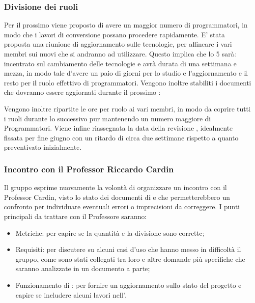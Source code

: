 \subsubsection{Divisione dei ruoli}
\par Per il prossimo  viene proposto di avere un maggior numero di programmatori, in modo che i lavori di conversione possano procedere rapidamente.
E' stata proposta una riunione di aggiornamento sulle tecnologie, per allineare i vari membri sui nuovi  che si andranno ad utilizzare.
Questo implica che lo  5 sarà: incentrato sul cambiamento delle tecnologie e avrà durata di una settimana e mezza, in modo tale d'avere un paio di giorni per lo studio e l'aggiornamento e il resto per il ruolo effettivo di programmatori.
Vengono inoltre stabiliti i documenti che dovranno essere aggiornati durante il prossimo :
Vengono inoltre ripartite le ore per ruolo ai vari membri, in modo da coprire tutti i ruoli durante lo  successivo pur mantenendo un numero maggiore di Programmatori. Viene infine riassegnata la data della revisione \RTB, idealmente fissata per fine giugno con un ritardo di circa due settimane rispetto a quanto preventivato inizialmente.

\subsubsection{Incontro con il Professor Riccardo Cardin}
\par Il gruppo esprime nuovamente la volontà di organizzare un incontro con il Professor Cardin, visto lo stato dei documenti di \AdR e \PdQ che permetterebbero un confronto per individuare eventuali errori o imprecisioni da correggere.
I punti principali da trattare con il Professore saranno:
\begin{itemize}
	\item Metriche: per capire se la quantità e la divisione sono corrette;
	\item Requisiti: per discutere su alcuni casi d'uso che hanno messo in difficoltà il gruppo, come sono stati collegati tra loro e altre domande più specifiche che saranno analizzate in un documento a parte;
	\item Funzionamento di : per fornire un aggiornamento sullo stato del progetto e capire se includere alcuni lavori nell'\AdR.
\end{itemize}

